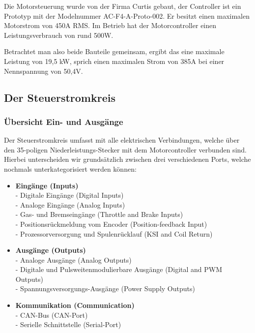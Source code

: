 Die Motorsteuerung wurde von der Firma Curtis gebaut, der Controller ist ein Prototyp mit der Modelnummer \glqq AC-F4-A-Proto-002\grqq{}. Er besitzt einen maximalen Motorstrom von 450A RMS. Im Betrieb hat der Motorcontroller einen Leistungsverbrauch von rund 500W.

Betrachtet man also beide Bauteile gemeinsam, ergibt das eine maximale Leistung von 19,5 kW, sprich einen maximalen Strom von 385A bei einer Nennspannung von 50,4V. 

\newpage


\subsection{Der Steuerstromkreis}
\subsubsection{Übersicht Ein- und Ausgänge}
Der Steuerstromkreis umfasst mit alle elektrischen Verbindungen, welche über den  35-poligen Niederleistungs-Stecker mit dem Motorcontroller verbunden sind. Hierbei unterscheiden wir grundsätzlich zwischen drei verschiedenen Ports, welche nochmals unterkategorisiert werden können:

\vspace{3mm}

\begin{itemize}
	\item \textbf{Eingänge (Inputs)}
	\\ - Digitale Eingänge (Digital Inputs)
	\\ - Analoge Eingänge (Analog Inputs)
	\\ - Gas- und Bremseingänge (Throttle and Brake Inputs)
	\\ - Positionsrückmeldung vom Encoder (Position-feedback Input)
	\\ - Prozessorversorgung und Spulenrücklauf (KSI and Coil Return)
	\item \textbf{Ausgänge (Outputs)}
	\\ - Analoge Ausgänge (Analog Outputs)
	\\ - Digitale und Pulsweitenmodulierbare Ausgänge (Digital and PWM Outputs)
	\\ - Spannungsversorgungs-Ausgänge (Power Supply Outputs)
	\item \textbf{Kommunikation (Communication)}
	\\ -  CAN-Bus (CAN-Port)
	\\ -  Serielle Schnittstelle (Serial-Port)
\end{itemize}

